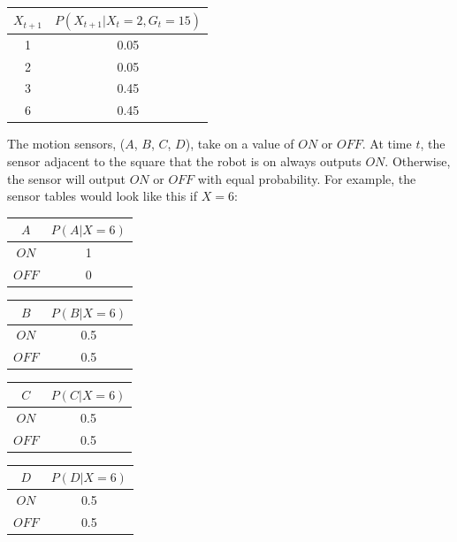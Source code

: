 \documentclass[12pt]{article}
\begin{document}
\begin{center}
\renewcommand{\arraystretch}{1.2}
\begin{tabular} {|c|c|}
\hline
$X_{t+1}$ & $P(X_{t+1}|X_t=2,G_t=15)$ \\
\hline
1 & 0.05 \\
2 & 0.05 \\
3 & 0.45 \\
6 & 0.45 \\
\hline
\end{tabular}
\end{center}
  
The motion sensors, ($A$, $B$, $C$, $D$), take on a value of $ON$ or
$OFF$.  At time $t$, the sensor adjacent to the square that the robot
is on always outputs $ON$. Otherwise, the sensor will output $ON$ or
$OFF$ with equal probability. For example, the sensor tables would
look like this if $X=6$:

\begin{center}
\begin{tabular} {|c|c|}
\hline
$A$ & $P(A|X=6)$ \\
\hline
$ON$ & 1 \\
$OFF$ & 0 \\
\hline
\end{tabular}
\begin{tabular} {|c|c|}
\hline
$B$ & $P(B|X=6)$ \\
\hline
$ON$ & 0.5 \\
$OFF$ & 0.5 \\
\hline
\end{tabular}
\begin{tabular} {|c|c|}
\hline
$C$ & $P(C|X=6)$ \\
\hline
$ON$ & 0.5 \\
$OFF$ & 0.5 \\
\hline
\end{tabular}
\begin{tabular} {|c|c|}
\hline
$D$ & $P(D|X=6)$ \\
\hline
$ON$  & 0.5 \\
$OFF$ & 0.5 \\
\hline
\end{tabular}
\end{center}

\clearpage
\end{document}
